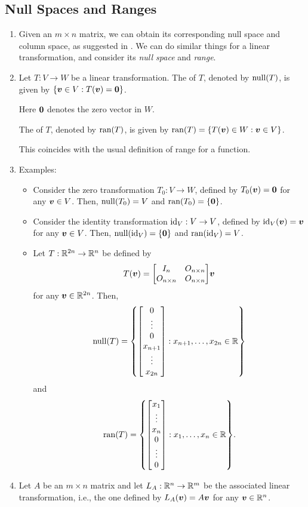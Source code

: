 \subsection{Null Spaces and Ranges}
\begin{enumerate}
\item Given an \(m\times n\) matrix, we can obtain its corresponding null space
and column space, as suggested in . We
can do similar things for a linear transformation, and consider its \emph{null
space} and \emph{range}.

\item Let \(T:V\to W\) be a linear transformation. The  of
\(T\), denoted by \(\operatorname{null}(T)\), is given by \(\{\vb*{v}\in V:T(\vb*{v})=\vb*{0}\}\).
\begin{note}
Here \(\vb*{0}\) denotes the zero vector in \(W\).
\end{note}

The  of \(T\), denoted by \(\operatorname{ran}(T)\), is given by
\(\operatorname{ran}(T)=\{T(\vb*{v})\in W:\vb*{v}\in V\}\). \begin{note} This coincides
with the usual definition of range for a function.
\end{note}

\item Examples:
\begin{itemize}
\item Consider the zero transformation \(T_0:V\to W\), defined by
\(T_0(\vb*{v})=\vb*{0}\) for any \(\vb*{v}\in V\). Then, \(\operatorname{null}(T_0)=V\) and
\(\operatorname{ran}(T_0)=\{\vb*{0}\}\).
\item Consider the identity transformation \(\operatorname{id}_{V}:V\to V\), defined by
\(\operatorname{id}_{V}(\vb*{v})=\vb*{v}\) for any \(\vb*{v}\in V\). Then,
\(\operatorname{null}(\operatorname{id}_{V})=\{\vb*{0}\}\) and \(\operatorname{ran}(\operatorname{id}_{V})=V\).
\item Let \(T:\mathbb{R}^{2n}\to\mathbb{R}^n\) be defined by
\[
T(\vect{v})=\mqty[I_n&O_{n\times n}\\ O_{n\times n}&O_{n\times n}]\vect{v}
\]
for any \(\vb*{v}\in\mathbb{R}^{2n}\). Then,
\[
\nul{T}=\qty{\mqty[0\\ \vdots\\0\\ x_{n+1}\\ \vdots\\ x_{2n}]:x_{n+1},\dotsc,x_{2n}\in\R}
\]
and
\[
\ran{T}=\qty{\mqty[x_1\\ \vdots\\x_n\\ 0\\ \vdots\\ 0]:x_{1},\dotsc,x_{n}\in\R}.
\]
\end{itemize}
\item \label{it:null-ran-relate-matx-sp}
Let \(A\) be an \(m\times n\) matrix and let \(L_A:\mathbb{R}^{n}\to\mathbb{R}^{m}\) be the
associated linear transformation, i.e., the one defined by
\(L_A(\vb*{v})=A\vb*{v}\) for any \(\vb*{v}\in\mathbb{R}^n\).


\end{enumerate}
